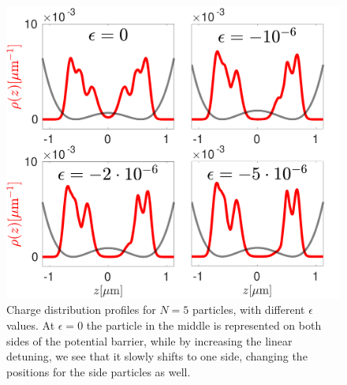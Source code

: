 \documentclass[aps, prb, floatfix, twocolumn, notitlepage, superscriptaddress, 10pt]{revtex4-2}
\newcommand{\n}{N}
\newcommand{\1}{{1\hspace*{-0.5ex} \textrm{l} \hspace*{0.5ex}}}
\begin{document}
%
%
% 

\begin{figure}[t!]
    \begin{center}
     \includegraphics[width=\columnwidth]{FiveParticleDensitySeriesv2.pdf}
     \caption{
      \label{fig:charge_distribution_n5} Charge distribution profiles for $N = 5$ particles, with different $\epsilon$ values. At $\epsilon = 0$ the particle in the middle is represented on both sides of the potential barrier, while by increasing the linear detuning, we see that it slowly shifts to one side, changing the positions for the side particles as well.}
	  \label{fig:charge_redistr_n5}
  \end{center}
\end{figure} 
\end{document}
